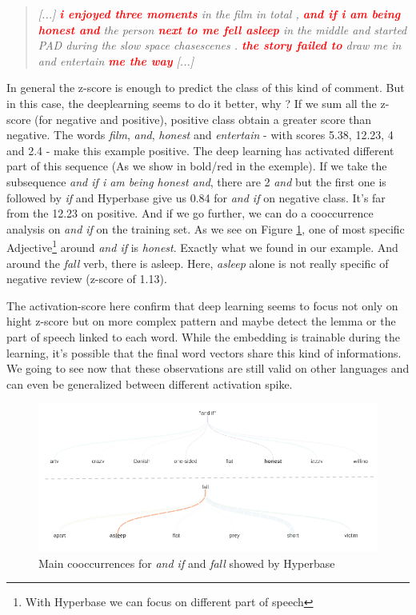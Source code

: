 \begin{quote}
\textit{[...] \textcolor{red}{\textbf{i enjoyed three moments}} in the film in total , \textcolor{red}{\textbf{and if i am being honest and}} the person \textcolor{red}{\textbf{next to me fell asleep}} in the middle and started PAD during the slow space chasescenes . \textcolor{red}{\textbf{the story failed to}} draw me in and entertain \textcolor{red}{\textbf{me the way}} [...]} 
\end{quote}

In general the z-score is enough to predict the class of this kind of comment. But in this case, the deeplearning seems to do it better, why ? If we sum all the z-score (for negative and positive), positive class obtain a greater score than negative. The words \textit{film}, \textit{and}, \textit{honest} and \textit{entertain} - with scores 5.38, 12.23, 4 and 2.4 - make this example positive. The deep learning has activated different part of this sequence (As we show in bold/red in the exemple). If we take the subsequence \textit{and if i am being honest and}, there are 2 \textit{and} but the first one is followed by \textit{if} and Hyperbase give us 0.84 for \textit{and if} on negative class. It's far from the 12.23 on positive. And if we go further, we can do a cooccurrence analysis on \textit{and if} on the training set. As we see on Figure \ref{data_english}, one of most specific Adjective\footnote{With Hyperbase we can focus on different part of speech } around \textit{and if} is \textit{honest}. Exactly what we found in our example. And around the \textit{fall} verb, there is asleep. Here, \textit{asleep} alone is not really specific of negative review (z-score of 1.13). 

The activation-score here confirm that deep learning seems to focus not only on hight z-score but on more complex pattern and maybe detect the lemma or the part of speech linked to each word. While the embedding is trainable during the learning, it's possible that the final word vectors share this kind of informations. We going to see now that these observations are still valid on other languages and can even be generalized between different activation spike.

\begin{figure}[h]
\begin{center}
\includegraphics[width=16cm]{img/cooc_english2.png}
\caption{Main cooccurrences for \textit{and if} and \textit{fall} showed by Hyperbase}
\label{data_english}
\end{center}
\end{figure}



